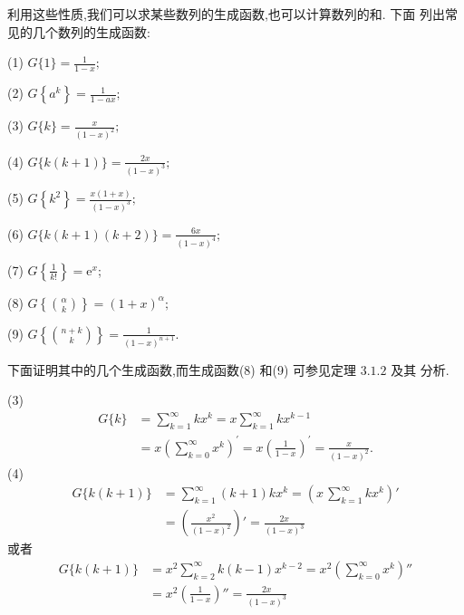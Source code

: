 \documentclass[punct]{ctexbeamer}
\def\pf{\noindent {\bf 证明\ }}
\begin{document}
\begin{frame}
	利用这些性质,我们可以求某些数列的生成函数,也可以计算数列的和. 下面 列出常见的几个数列的生成函数:


		(1) $G\{1\}=\frac{1}{1-x} ;$

		(2) $G\left\{a^{k}\right\}=\frac{1}{1-a x} ;$

		(3) $G\{k\}=\frac{x}{(1-x)^{2}};$

		(4) $G\{k(k+1)\}=\frac{2 x}{(1-x)^{3}};$

		(5) $G\left\{k^{2}\right\}=\frac{x(1+x)}{(1-x)^{3}};$

	(6) $G\{k(k+1)(k+2)\}=\frac{6 x}{(1-x)^{4}};$

	(7) $G\left\{\frac{1}{k !}\right\}=\mathrm{e}^{x}$;

	(8) $G\left\{\binom{\alpha}{k}\right\}=(1+x)^{\alpha};$

	(9) $G\left\{\binom{n+k}{k}\right\}=\frac{1}{(1-x)^{n+1}}.$

\end{frame}

\begin{frame}
	下面证明其中的几个生成函数,而生成函数(8) 和(9) 可参见定理 $3.1.2$ 及其 分析.

	\pf(3)
	$$
	\begin{aligned}
	G\{k\} &=\sum_{k=1}^{\infty} k x^{k}=x \sum_{k=1}^{\infty} k x^{k-1} \\
	&=x\left(\sum_{k=0}^{\infty} x^{k}\right)^{\prime}=x\left(\frac{1}{1-x}\right)^{\prime}=\frac{x}{(1-x)^{2}}.
	\end{aligned}
	$$
(4)
\begin{align*}
G\{k(k+1)\} & = \sum_{k=1}^{\infty}(k+1) k x^{k}
=  \left(x\, \sum_{k=1}^{\infty}k  x^{k} \right)'\\
& = \left( \frac{x^2}{(1-x)^{2}} \right)' = \frac{2 x}{(1-x)^{3}}
\end{align*}
或者
\begin{align*}
    G\{k(k+1)\} & = x^2 \sum_{k=2}^{\infty} k (k-1)x^{k-2} = x^2 \left( \sum_{k=0}^{\infty}  x^{k} \right)'' \\
& = x^2 \left( \frac{1}{1-x} \right)'' = \frac{2 x}{(1-x)^{3}}
\end{align*}

\end{frame}
\end{document}
